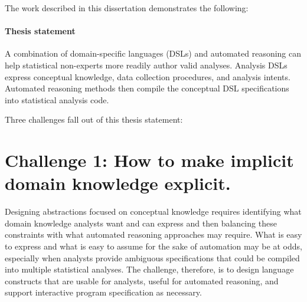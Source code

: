 The work described in this dissertation demonstrates the following:%
\paragraph{Thesis statement} \label{para:thesisStatement}



A combination of domain-specific languages (DSLs) and automated reasoning can
help statistical non-experts more readily author valid analyses. Analysis DSLs
express conceptual knowledge, data collection procedures, and
analysis intents. Automated reasoning methods then compile the conceptual
DSL specifications into statistical analysis code.


Three challenges fall out of this thesis statement: 

\section*{Challenge 1: How to make implicit domain knowledge explicit.} %
Designing abstractions focused on conceptual knowledge requires identifying what
domain knowledge analysts want and can express and then balancing these
constraints with what automated reasoning approaches may require. What is easy
to express and what is easy to assume for the sake of automation may be at odds,
especially when analysts provide ambiguous specifications that could be compiled
into multiple statistical analyses. The challenge, therefore, is to design
language constructs that are usable for analysts, useful for automated
reasoning, and support interactive program specification as necessary.

